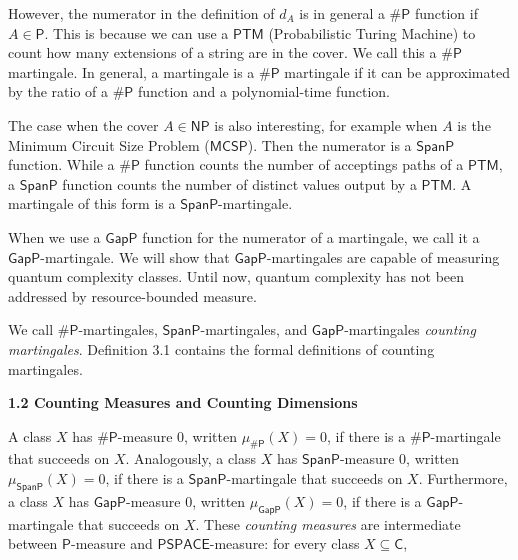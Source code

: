 \documentclass[10pt,a4paper]{article}
\begin{document}
However, the numerator in the definition of $d_{A}$ is in general a ${\mathsf{\#}\mathsf{P}}$
function if $A\in\mathsf{P}$. This is because we can use a $\mathsf{PTM}$ (Probabilistic Turing Machine) to count how many extensions of a string are in the cover. We call this a ${\mathsf{\#}\mathsf{P}}$ martingale. In general, a martingale is a ${\mathsf{\#}\mathsf{P}}$ martingale if it can be approximated by the
ratio of a ${\mathsf{\#}\mathsf{P}}$ function and a polynomial-time function.\par




The case when the cover $A\in\mathsf{NP}$ is also interesting, for example when $A$ is the Minimum Circuit Size Problem ($\mathsf{MCSP}$). Then the numerator is a $\mathsf{SpanP}$ function. While a ${\mathsf{\#}\mathsf{P}}$ function counts the number of acceptings paths of a $\mathsf{PTM}$, a $\mathsf{SpanP}$ function counts the number of distinct values output by a $\mathsf{PTM}$. A martingale of this form is a $\mathsf{SpanP}$-martingale.\par




When we use a $\mathsf{GapP}$ function for the numerator of a martingale, we call it a $\mathsf{GapP}$-martingale. We will show that $\mathsf{GapP}$-martingales are capable of measuring quantum complexity classes. Until now, quantum complexity has not been addressed by resource-bounded measure.\par




We call ${\mathsf{\#}\mathsf{P}}$-martingales, $\mathsf{SpanP}$-martingales, and $\mathsf{GapP}$-martingales \emph{counting martingales}.
Definition 3.1 contains the formal definitions of counting martingales.\par





\par\medskip\noindent\textbf{
1.2 Counting Measures and Counting Dimensions}\par




A class $X$ has ${\mathsf{\#}\mathsf{P}}$-measure 0, written $\mu_{{\mathsf{\#}\mathsf{P}}}(X)=0$,
if there is a ${\mathsf{\#}\mathsf{P}}$-martingale that succeeds on $X$.
Analogously, a class $X$ has $\mathsf{SpanP}$-measure 0, written $\mu_{\mathsf{SpanP}}(X)=0$,
if there is a $\mathsf{SpanP}$-martingale that succeeds on $X$. Furthermore, a class $X$ has
$\mathsf{GapP}$-measure 0, written $\mu_{\mathsf{GapP}}(X)=0$, if there is a $\mathsf{GapP}$-martingale that succeeds on $X$.
These \emph{counting measures} are
intermediate between $\mathsf{P}$-measure and $\mathsf{PSPACE}$-measure:
for every class $X\subseteq\mathsf{C}$,\par
\end{document}
